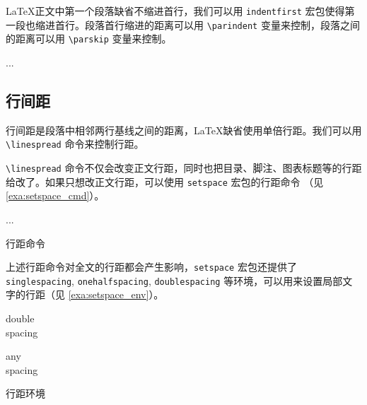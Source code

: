 \LaTeX 正文中第一个段落缺省不缩进首行，我们可以用 \texttt{indentfirst} 宏包使得第一段也缩进首行。段落首行缩进的距离可以用 \verb|\parindent| 变量来控制，段落之间的距离可以用 \verb|\parskip| 变量来控制。

\begin{Code}[]
\usepackage{indentfirst}
...
\setlength{\parindent}{2em}
\addtolength{\parskip}{3pt}
\end{Code}

\subsection{行间距}
行间距是段落中相邻两行基线之间的距离，\LaTeX 缺省使用单倍行距。我们可以用 \verb|\linespread| 命令来控制行距。

\begin{Code}[]
\linespread{1.3} %
\linespread{1.6} %
\end{Code}

\verb|\linespread| 命令不仅会改变正文行距，同时也把目录、脚注、图表标题等的行距给改了。如果只想改正文行距，可以使用 \texttt{setspace} 宏包的行距命令 （见 \autoref{exa:setspace_cmd}）。

\begin{example}[h]
\begin{Code}[]
\usepackage{setspace}
...
\singlespacing    %
\onehalfspacing   %
\doublespacing    %
\end{Code}
\caption{行距命令}
\label{exa:setspace_cmd}
\end{example}

上述行距命令对全文的行距都会产生影响，\texttt{setspace} 宏包还提供了 \texttt{singlespacing}, \texttt{onehalfspacing}, \texttt{doublespacing} 等环境，可以用来设置局部文字的行距（见 \autoref{exa:setspace_env}）。

\begin{example}[h]
\begin{RLDemo}[]
\begin{doublespacing}
double\\spacing
\end{doublespacing}
\end{RLDemo}
\begin{RLDemo}[]
\begin{spacing}{1.25}
any\\spacing
\end{spacing}
\end{RLDemo}
\caption{行距环境}
\label{exa:setspace_env}
\end{example}

